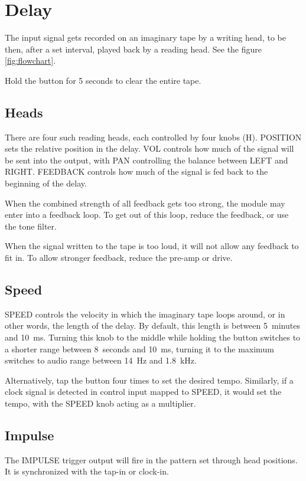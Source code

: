 \documentclass[11pt]{article}
\begin{document}
\begin{minipage}[t]{0.45\textwidth}
\setlength{\parskip}{6pt}

\section{Delay}

The input signal gets recorded on an imaginary tape by a writing head, to be
then, after a set interval, played back by a reading head. See the figure 
\ref{fig:flowchart}.

Hold the button for 5 seconds to clear the entire tape.

\subsection{Heads}

There are four such reading heads, each controlled by four knobs (H). POSITION
sets the relative position in the delay. VOL controls how much of the signal
will be sent into the output, with PAN controlling the balance between LEFT and
RIGHT. FEEDBACK controls how much of the signal is fed back to the beginning of
the delay.

When the combined strength of all feedback gets too strong, the module may enter
into a feedback loop. To get out of this loop, reduce the feedback, or use the
tone filter.

When the signal written to the tape is too loud, it will not allow any feedback
to fit in. To allow stronger feedback, reduce the pre-amp or drive.

\subsection{Speed}

SPEED controls the velocity in which the imaginary tape loops around, or in
other words, the length of the delay. By default, this length is between
5~minutes and 10~ms. Turning this knob to the middle while holding the button
switches to a shorter range between 8~seconds and 10~ms, turning it to the
maximum switches to audio range between 14~Hz and 1.8~kHz.

Alternatively, tap the button four times to set the desired tempo.
Similarly, if a clock signal is detected in control input mapped to SPEED, it
would set the tempo, with the SPEED knob acting as a multiplier.

\subsection{Impulse}

The IMPULSE trigger output will fire in the pattern set through head positions.
It is synchronized with the tap-in or clock-in.

\vspace{5mm}

\newpage

\end{minipage}
\end{document}
